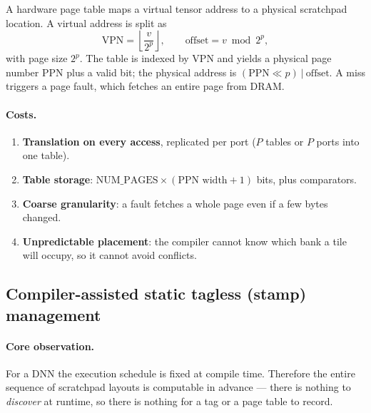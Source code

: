 \documentclass[11pt,a4paper]{article}
\begin{document}
A hardware page table maps a virtual tensor address to a physical scratchpad
location. A virtual address is split as
\[
  \text{VPN} = \left\lfloor \frac{v}{2^{p}} \right\rfloor, \qquad
  \text{offset} = v \bmod 2^{p},
\]
with page size $2^p$. The table is indexed by VPN and yields a physical page
number PPN plus a valid bit; the physical address is
$(\text{PPN} \ll p)\ |\ \text{offset}$. A miss triggers a page fault, which
fetches an entire page from DRAM.

\paragraph{Costs.}
\begin{enumerate}[leftmargin=1.4em,itemsep=2pt]
  \item \textbf{Translation on every access}, replicated per port ($P$ tables
        or $P$ ports into one table).
  \item \textbf{Table storage}: $\text{NUM\_PAGES} \times (\text{PPN width} + 1)$
        bits, plus comparators.
  \item \textbf{Coarse granularity}: a fault fetches a whole page even if a few
        bytes changed.
  \item \textbf{Unpredictable placement}: the compiler cannot know which bank a
        tile will occupy, so it cannot avoid conflicts.
\end{enumerate}

\subsection{Compiler-assisted static tagless (stamp) management}

\paragraph{Core observation.} For a DNN the execution schedule is fixed at
compile time. Therefore the entire sequence of scratchpad layouts is computable
in advance --- there is nothing to \emph{discover} at runtime, so there is
nothing for a tag or a page table to record.
\end{document}
